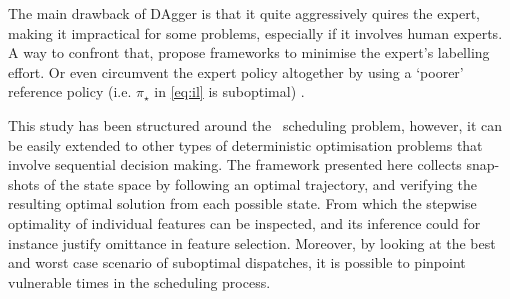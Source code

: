\documentclass[twocolumn]{svjour3}
\begin{document}

The main drawback of DAgger is that it quite aggressively quires the expert, 
making it impractical for some problems, especially if it involves human 
experts. A way to confront that, \cite{Kim13,Judah12} propose frameworks to 
minimise the expert's labelling effort.
Or even circumvent the expert policy altogether by using a `poorer' reference 
policy (i.e. $\pi_\star$ in \cref{eq:il} is suboptimal) \cite{ChangKADL15}.

This study has been structured around the \jsp\ scheduling problem, however, 
it can be easily extended to other types of deterministic optimisation problems 
that involve sequential decision making. 
The framework presented here collects snap-shots of the state space by 
following an optimal trajectory, and verifying the resulting optimal solution 
from each possible state. 
From which the stepwise optimality of individual features can be inspected, 
and its inference could for instance justify omittance in feature selection. 
Moreover, by looking at the best and worst case scenario of suboptimal 
dispatches, it is possible to pinpoint vulnerable times in the scheduling 
process. 

 
 
\end{document}
